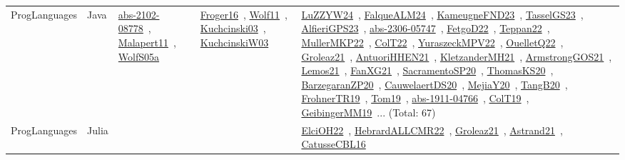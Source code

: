 {\begin{longtable}{lp{3cm}>{\raggedright\arraybackslash}p{6cm}>{\raggedright\arraybackslash}p{6cm}>{\raggedright\arraybackslash}p{8cm}}
ProgLanguages & Java & \href{../works/abs-2102-08778.pdf}{abs-2102-08778}~\cite{abs-2102-08778}, \href{../works/Malapert11.pdf}{Malapert11}~\cite{Malapert11}, \href{../works/WolfS05a.pdf}{WolfS05a}~\cite{WolfS05a} & \href{../works/Froger16.pdf}{Froger16}~\cite{Froger16}, \href{../works/Wolf11.pdf}{Wolf11}~\cite{Wolf11}, \href{../works/Kuchcinski03.pdf}{Kuchcinski03}~\cite{Kuchcinski03}, \href{../works/KuchcinskiW03.pdf}{KuchcinskiW03}~\cite{KuchcinskiW03} & \href{../works/LuZZYW24.pdf}{LuZZYW24}~\cite{LuZZYW24}, \href{../works/FalqueALM24.pdf}{FalqueALM24}~\cite{FalqueALM24}, \href{../works/KameugneFND23.pdf}{KameugneFND23}~\cite{KameugneFND23}, \href{../works/TasselGS23.pdf}{TasselGS23}~\cite{TasselGS23}, \href{../works/AlfieriGPS23.pdf}{AlfieriGPS23}~\cite{AlfieriGPS23}, \href{../works/abs-2306-05747.pdf}{abs-2306-05747}~\cite{abs-2306-05747}, \href{../works/FetgoD22.pdf}{FetgoD22}~\cite{FetgoD22}, \href{../works/Teppan22.pdf}{Teppan22}~\cite{Teppan22}, \href{../works/MullerMKP22.pdf}{MullerMKP22}~\cite{MullerMKP22}, \href{../works/ColT22.pdf}{ColT22}~\cite{ColT22}, \href{../works/YuraszeckMPV22.pdf}{YuraszeckMPV22}~\cite{YuraszeckMPV22}, \href{../works/OuelletQ22.pdf}{OuelletQ22}~\cite{OuelletQ22}, \href{../works/Groleaz21.pdf}{Groleaz21}~\cite{Groleaz21}, \href{../works/AntuoriHHEN21.pdf}{AntuoriHHEN21}~\cite{AntuoriHHEN21}, \href{../works/KletzanderMH21.pdf}{KletzanderMH21}~\cite{KletzanderMH21}, \href{../works/ArmstrongGOS21.pdf}{ArmstrongGOS21}~\cite{ArmstrongGOS21}, \href{../works/Lemos21.pdf}{Lemos21}~\cite{Lemos21}, \href{../works/FanXG21.pdf}{FanXG21}~\cite{FanXG21}, \href{../works/SacramentoSP20.pdf}{SacramentoSP20}~\cite{SacramentoSP20}, \href{../works/ThomasKS20.pdf}{ThomasKS20}~\cite{ThomasKS20}, \href{../works/BarzegaranZP20.pdf}{BarzegaranZP20}~\cite{BarzegaranZP20}, \href{../works/CauwelaertDS20.pdf}{CauwelaertDS20}~\cite{CauwelaertDS20}, \href{../works/MejiaY20.pdf}{MejiaY20}~\cite{MejiaY20}, \href{../works/TangB20.pdf}{TangB20}~\cite{TangB20}, \href{../works/FrohnerTR19.pdf}{FrohnerTR19}~\cite{FrohnerTR19}, \href{../works/Tom19.pdf}{Tom19}~\cite{Tom19}, \href{../works/abs-1911-04766.pdf}{abs-1911-04766}~\cite{abs-1911-04766}, \href{../works/ColT19.pdf}{ColT19}~\cite{ColT19}, \href{../works/GeibingerMM19.pdf}{GeibingerMM19}~\cite{GeibingerMM19}... (Total: 67)\\
ProgLanguages & Julia &  &  & \href{../works/ElciOH22.pdf}{ElciOH22}~\cite{ElciOH22}, \href{../works/HebrardALLCMR22.pdf}{HebrardALLCMR22}~\cite{HebrardALLCMR22}, \href{../works/Groleaz21.pdf}{Groleaz21}~\cite{Groleaz21}, \href{../works/Astrand21.pdf}{Astrand21}~\cite{Astrand21}, \href{../works/CatusseCBL16.pdf}{CatusseCBL16}~\cite{CatusseCBL16}\\

\end{longtable}}
